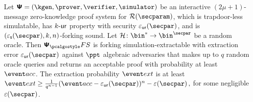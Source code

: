\begin{theorem}
  \label{thm:se}
  Let $\ps = (\kgen, \prover, \verifier, \simulator)$ be an interactive $(2 \mu + 1)$-message
  zero-knowledge proof system for $\RELGEN(\secparam)$, which is trapdoor-less simulatable, has
  ${k\text{-}\mathsf{ur}}$ property with security $\epsur(\secpar)$, and is $(\epss(\secpar), k, n)$-forking
  sound.  Let $\ro\colon \bin^{*} \to \bin^{\secpar}$ be a random oracle.  Then $\psfs$ is
  forking simulation-extractable with extraction error $\epsur(\secpar)$ against $\ppt$
  algebraic adversaries that makes up to $q$ random oracle queries and returns an acceptable
  proof with probability at least $\accProb$.  The extraction probability $\extProb$ is at
  least
  \( \extProb \geq \frac{1}{q^{n - 1}} (\accProb - \epsur(\secpar))^{n} -\eps(\secpar)\,, \)
  for some negligible $\eps(\secpar)$.
\end{theorem}
